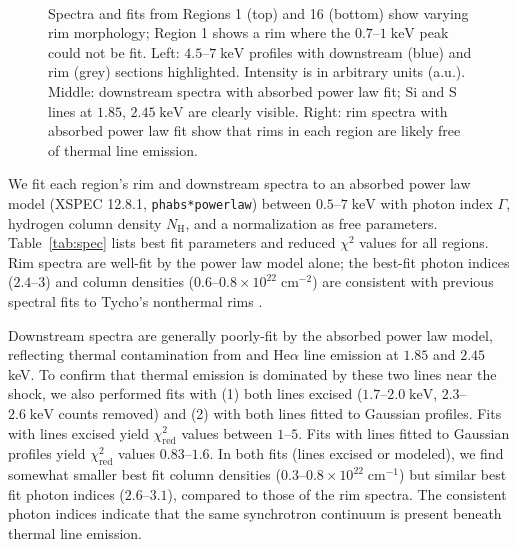 \documentclass[iop, apj, numberedappendix]{emulateapj}
\newcommand*{\mt}{\mathrm}
\newcommand*{\unit}[1]{\;\mt{#1}}  %
\begin{document}
\begin{figure*}
    \iftoggle{manuscript}{
        \epsscale{0.7}
    }{}
     \\
    \caption{Spectra and fits from Regions 1 (top) and 16 (bottom) show varying
        rim morphology; Region 1 shows a rim where the $0.7$--$1 \unit{keV}$
        peak could not be fit.  Left: $4.5$--$7 \unit{keV}$ profiles with
        downstream (blue) and rim (grey) sections highlighted.  Intensity is in
        arbitrary units (a.u.).  Middle: downstream spectra with absorbed
        power law fit; Si and S lines at $1.85$, $2.45 \unit{keV}$ are clearly
        visible.  Right: rim spectra with absorbed power law fit show that
        rims in each region are likely free of thermal line emission.}
    \label{fig:spec}
\end{figure*}

We fit each region's rim and downstream spectra to an absorbed power law model
(XSPEC 12.8.1, \texttt{phabs*powerlaw}) between $0.5$--$7 \unit{keV}$ with
photon index $\Gamma$, hydrogen column density $N_{\mt{H}}$, and a
normalization as free parameters.  Table~\ref{tab:spec} lists best fit
parameters and reduced $\chi^2$ values for all regions.  Rim spectra are
well-fit by the power law model alone; the best-fit photon indices ($2.4$--$3$)
and column densities ($0.6$--$0.8 \times 10^{22} \unit{cm^{-2}}$) are
consistent with previous spectral fits to Tycho's nonthermal rims
\citep{hwang2002, cassam-chenai2007}.

Downstream spectra are generally poorly-fit by the absorbed power law model,
reflecting thermal contamination from  and  He$\alpha$
line emission at $1.85$ and $2.45$ keV.  To confirm that thermal emission is
dominated by these two lines near the shock, we also performed fits with (1)
both lines excised ($1.7$--$2.0 \unit{keV}$, $2.3$--$2.6 \unit{keV}$ counts
removed) and (2) with both lines fitted to Gaussian profiles.  Fits with lines
excised yield $\chi^2_{\mt{red}}$ values between $1$--$5$.  Fits with lines
fitted to Gaussian profiles yield $\chi^2_{\mt{red}}$ values $0.83$--$1.6$.  In
both fits (lines excised or modeled), we find somewhat smaller best fit column
densities ($0.3$--$0.8 \times 10^{22} \unit{cm^{-1}}$) but similar best fit
photon indices ($2.6$--$3.1$), compared to those of the rim spectra.  The
consistent photon indices indicate that the same synchrotron continuum is
present beneath thermal line emission.
\end{document}
